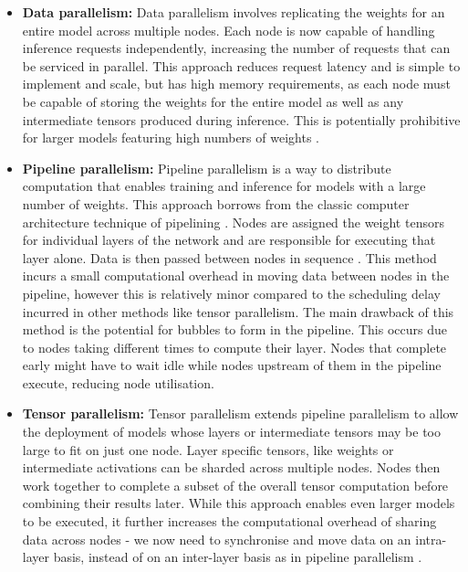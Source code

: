 \documentclass[12pt,twoside]{report}
\begin{document}
\begin{itemize}
  \item \textbf{Data parallelism:} Data parallelism involves replicating the weights for an entire model across multiple nodes.
    Each node is now capable of handling inference requests independently, increasing the number of requests that can be serviced in parallel.  
    This approach reduces request latency and is simple to implement and scale, but has high memory requirements, as each node must be capable of storing the weights for the entire model as well as any intermediate tensors produced during inference.
    This is potentially prohibitive for larger models featuring high numbers of weights \cite{rae2021scaling} \cite{brown2020language} \cite{chowdhery2023palm} .
  \item \textbf{Pipeline parallelism:} Pipeline parallelism is a way to distribute computation that enables training and inference for models with a large number of weights.
    This approach borrows from the classic computer architecture technique of pipelining \cite{hennessy2011computer}.
    Nodes are assigned the weight tensors for individual layers of the network and are responsible for executing that layer alone.
    Data is then passed between nodes in sequence \cite{huang2019gpipe}.
    This method incurs a small computational overhead in moving data between nodes in the pipeline, however this is relatively minor compared to the scheduling delay incurred in other methods like tensor parallelism.
    The main drawback of this method is the potential for bubbles to form in the pipeline.
    This occurs due to nodes taking different times to compute their layer.
    Nodes that complete early might have to wait idle while nodes upstream of them in the pipeline execute, reducing node utilisation.
  \item \textbf{Tensor parallelism:} Tensor parallelism extends pipeline parallelism to allow the deployment of models whose layers or intermediate tensors may be too large to fit on just one node.
    Layer specific tensors, like weights or intermediate activations can be sharded across multiple nodes. 
    Nodes then work together to complete a subset of the overall tensor computation before combining their results later.
    While this approach enables even larger models to be executed, it further increases the computational overhead of sharing data across nodes - we now need to synchronise and move data on an intra-layer basis, instead of on an inter-layer basis as in pipeline parallelism \cite{shoeybi2019megatron}.
\end{itemize}
\end{document}

